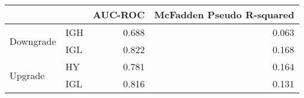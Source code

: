 \begin{tabular}{llrr}
\toprule
 &  & AUC-ROC & McFadden Pseudo R-squared \\
\midrule
\multirow[t]{2}{*}{Downgrade} & IGH & 0.688 & 0.063 \\
 & IGL & 0.822 & 0.168 \\
\cline{1-4}
\multirow[t]{2}{*}{Upgrade} & HY & 0.781 & 0.164 \\
 & IGL & 0.816 & 0.131 \\
\cline{1-4}
\bottomrule
\end{tabular}
